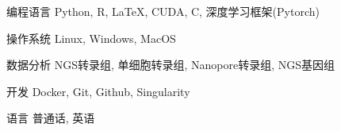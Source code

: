 

\begin{cvskills}





\cvskill
  {编程语言} %
  {Python, R, LaTeX, CUDA, C, 深度学习框架(Pytorch)} %

\cvskill
  {操作系统} %
  {Linux, Windows, MacOS} %

\cvskill
  {数据分析} %
  {NGS转录组, 单细胞转录组, Nanopore转录组, NGS基因组} %

\cvskill
  {开发} %
  {Docker, Git, Github, Singularity} %

\cvskill
  {语言} %
  {普通话, 英语} %

\end{cvskills}
